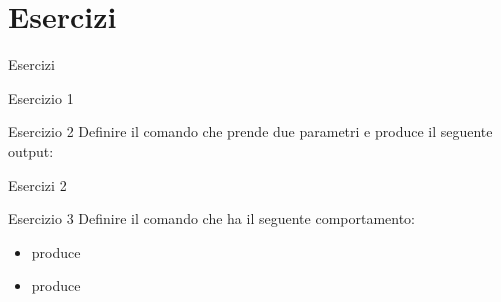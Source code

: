 \section{Esercizi}
\begin{frame}{Esercizi}

\begin{esercizio}{Esercizio 1}
\end{esercizio}
\begin{esercizio}{Esercizio 2}
Definire il comando \texttt{\add} che prende due parametri e produce il seguente output:\\
\centering
{}
\end{esercizio}
\end{frame}

\begin{frame}{Esercizi 2}
\begin{esercizio}{Esercizio 3}
Definire il comando \texttt{\price} che ha il seguente comportamento:
\begin{itemize}
\item \texttt{} produce 
\item \texttt{} produce 

\end{itemize}
\end{esercizio}


\end{frame}